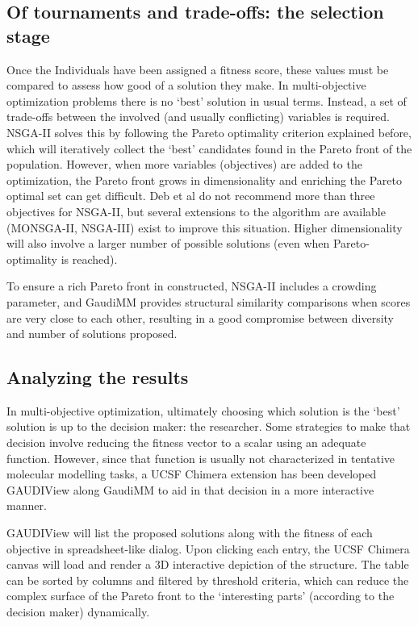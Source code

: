 \subsection{Of tournaments and trade-offs: the selection stage}
Once the Individuals have been assigned a fitness score, these values must be compared to assess how good of a solution they make. In multi-objective optimization problems there is no ‘best’ solution in usual terms. Instead, a set of trade-offs between the involved (and usually conflicting) variables is required. NSGA-II solves this by following the Pareto optimality criterion explained before, which will iteratively collect the ‘best’ candidates found in the Pareto front of the population. However, when more variables (objectives) are added to the optimization, the Pareto front grows in dimensionality and enriching the Pareto optimal set can get difficult. Deb et al do not recommend more than three objectives for NSGA-II, but several extensions to the algorithm are available (MONSGA-II, NSGA-III) exist to improve this situation. Higher dimensionality will also involve a larger number of possible solutions (even when Pareto-optimality is reached).

To ensure a rich Pareto front in constructed, NSGA-II includes a crowding parameter, and GaudiMM provides structural similarity comparisons when scores are very close to each other, resulting in a good compromise between diversity and number of solutions proposed.

\subsection{Analyzing the results}
In multi-objective optimization, ultimately choosing which solution is the ‘best’ solution is up to the decision maker: the researcher. Some strategies to make that decision involve reducing the fitness vector to a scalar using an adequate function. However, since that function is usually not characterized in tentative molecular modelling tasks, a UCSF Chimera extension has been developed GAUDIView along GaudiMM to aid in that decision in a more interactive manner.

GAUDIView will list the proposed solutions along with the fitness of each objective in spreadsheet-like dialog. Upon clicking each entry, the UCSF Chimera canvas will load and render a 3D interactive depiction of the structure. The table can be sorted by columns and filtered by threshold criteria, which can reduce the complex surface of the Pareto front to the ‘interesting parts’ (according to the decision maker) dynamically.






